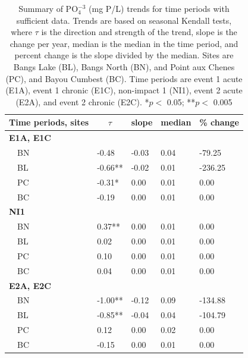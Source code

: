 \documentclass[letterpaper,12pt]{article}\usepackage[]{graphicx}\usepackage[]{color}
\newcommand{\beginsupplement}{%
        \setcounter{table}{0}
        \renewcommand{\thetable}{S\arabic{table}}%
        \setcounter{figure}{0}
        \renewcommand{\thefigure}{S\arabic{figure}}%
     }
\begin{document}
\clearpage

\setcounter{table}{2}

\begin{table}[!tbp]
\caption{Summary of PO$_4^{-3}$ (mg P/L) trends for time periods with sufficient data.  Trends are based on seasonal Kendall tests, where $\tau$ is the direction and strength of the trend, slope is the change per year, median is the median in the time period, and percent change is the slope divided by the median.  Sites are Bangs Lake (BL), Bangs North (BN), and Point aux Chenes (PC), and Bayou Cumbest (BC). Time periods are event 1 acute (E1A), event 1 chronic (E1C), non-impact 1 (NI1), event 2 acute (E2A), and event 2 chronic (E2C). *$p <$ 0.05; **$p <$ 0.005\label{tab:PO4Ftrnd}} 
\begin{center}
\begin{tabular}{lllll}
\hline\hline
\multicolumn{1}{l}{Time periods, sites}&\multicolumn{1}{c}{$\tau$}&\multicolumn{1}{c}{slope}&\multicolumn{1}{c}{median}&\multicolumn{1}{c}{\% change}\tabularnewline
\hline
{\bfseries E1A, E1C}&&&&\tabularnewline
~~BN&-0.48&-0.03&0.04&-79.25\tabularnewline
~~BL&-0.66**&-0.02&0.01&-236.25\tabularnewline
~~PC&-0.31*&0.00&0.01&0.00\tabularnewline
~~BC&-0.19&0.00&0.01&0.00\tabularnewline
\hline
{\bfseries NI1}&&&&\tabularnewline
~~BN&0.37**&0.00&0.01&0.00\tabularnewline
~~BL&0.02&0.00&0.01&0.00\tabularnewline
~~PC&0.10&0.00&0.01&0.00\tabularnewline
~~BC&0.04&0.00&0.01&0.00\tabularnewline
\hline
{\bfseries E2A, E2C}&&&&\tabularnewline
~~BN&-1.00**&-0.12&0.09&-134.88\tabularnewline
~~BL&-0.85**&-0.04&0.04&-104.79\tabularnewline
~~PC&0.12&0.00&0.02&0.00\tabularnewline
~~BC&-0.15&0.00&0.01&0.00\tabularnewline
\hline
\end{tabular}\end{center}
\end{table}

\clearpage

\beginsupplement
\end{document}
